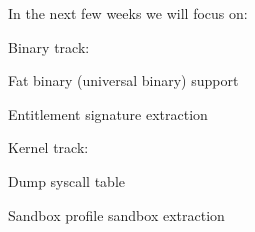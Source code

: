 
In the next few weeks we will focus on:

\begin{description}
    \item Binary track:
            \begin{description}
                \item Fat binary (universal binary) support
                \item Entitlement signature extraction
            \end{description}
    \item Kernel track:
            \begin{description}
                \item Dump syscall table
                \item Sandbox profile sandbox extraction
            \end{description}
\end{description}
